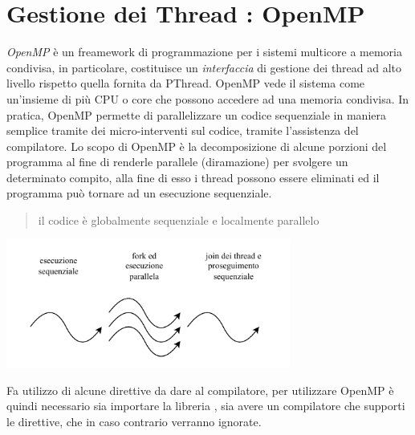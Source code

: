 \documentclass[10pt, letterpaper]{report}
\begin{document}
\chapter{Gestione dei Thread : OpenMP}
\textit{OpenMP} è un freamework di programmazione per i sistemi multicore a memoria condivisa, in particolare, costituisce un \textit{interfaccia} di gestione dei thread ad alto livello rispetto quella fornita da PThread. OpenMP vede il sistema come un'insieme di più CPU o core che possono accedere ad una memoria condivisa. In pratica, OpenMP permette di parallelizzare un codice sequenziale in maniera semplice tramite dei micro-interventi sul codice, tramite l'assistenza del compilatore.\acc 
Lo scopo di OpenMP è la decomposizione di alcune porzioni del programma al fine di renderle parallele (diramazione) per svolgere un determinato compito, alla fine di esso i thread possono essere eliminati ed il programma può tornare ad un esecuzione sequenziale.\begin{quote}
    il codice è globalmente sequenziale e localmente parallelo
\end{quote}
\begin{center}
    \includegraphics[width=0.7\textwidth ]{images/openMP.pdf}
\end{center}
Fa utilizzo di alcune direttive da dare al compilatore, per utilizzare OpenMP è quindi necessario sia importare la libreria , sia avere un compilatore che supporti le direttive, che in caso contrario verranno ignorate.
\end{document}
